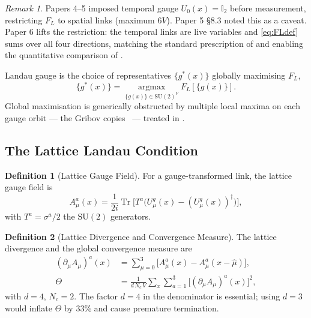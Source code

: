 \documentclass[11pt,a4paper]{article}
\theoremstyle{plain}
\theoremstyle{definition}
\newtheorem{definition}{Definition}
\theoremstyle{remark}
\newtheorem*{remark}{Remark}
\newcommand{\SU}{\mathrm{SU}}
\newcommand{\Tr}{\operatorname{Tr}}
\newcommand{\FL}{F_{L}}
\newcommand{\Id}{\mathbb{I}}
\newcommand{\Lcond}{\partial_{\mu}A_{\mu}}
\begin{document}
\begin{remark}
Papers 4--5 imposed temporal gauge $U_0(x)=\Id_2$ before measurement,
restricting $\FL$ to spatial links (maximum $6V$). Paper 5 \S8.3 noted
this as a caveat. Paper 6 lifts the restriction: the temporal links are
live variables and \eqref{eq:FLdef} sums over all four directions,
matching the standard prescription of \cite{CM,Bo} and enabling the
quantitative comparison of .
\end{remark}

Landau gauge is the choice of representatives $\{g^{*}(x)\}$ globally
maximising $\FL$,
\begin{equation}
  \{g^{*}(x)\}=\operatorname*{argmax}_{\{g(x)\}\in\SU(2)^{V}}
  \FL[\{g(x)\}].
  \label{eq:argmax}
\end{equation}
Global maximisation is generically obstructed by multiple local maxima
on each gauge orbit --- the Gribov copies~\cite{Gri,Zwa} --- treated in
.

\subsection{The Lattice Landau Condition}
\label{ssec:landaucond}

\begin{definition}[Lattice Gauge Field]
For a gauge-transformed link, the lattice gauge field is
\begin{equation}
  A^{a}_{\mu}(x)=\frac{1}{2i}\Tr\!\bigl[T^{a}
  \bigl(U^{g}_{\mu}(x)-(U^{g}_{\mu}(x))^{\dagger}\bigr)\bigr],
  \label{eq:Afield}
\end{equation}
with $T^{a}=\sigma^{a}/2$ the $\SU(2)$ generators.
\end{definition}

\begin{definition}[Lattice Divergence and Convergence Measure]
The lattice divergence and the global convergence measure are
\begin{align}
  (\Lcond)^{a}(x)&=\sum_{\mu=0}^{3}
  \bigl[A^{a}_{\mu}(x)-A^{a}_{\mu}(x-\hat\mu)\bigr],
  \label{eq:divergence}\\
  \Theta&=\frac{1}{d\,N_c\,V}\sum_{x}\sum_{a=1}^{3}
  \bigl[(\Lcond)^{a}(x)\bigr]^{2},
  \label{eq:Theta}
\end{align}
with $d=4$, $N_c=2$. The factor $d=4$ in the denominator is essential;
using $d=3$ would inflate $\Theta$ by $33\%$ and cause premature
termination.
\end{definition}
\end{document}
